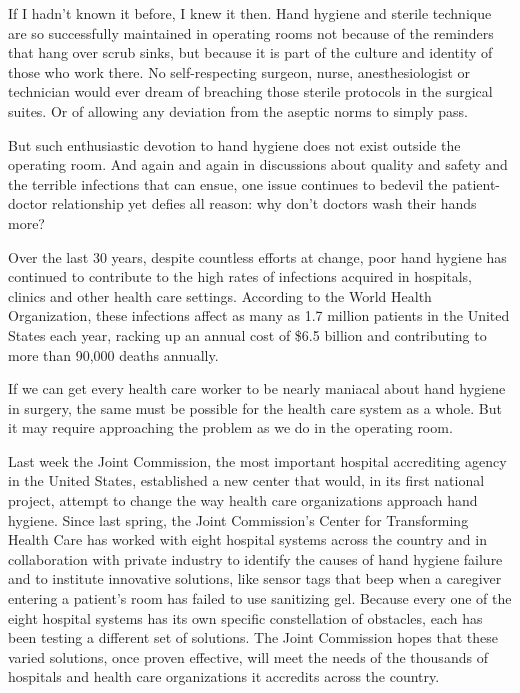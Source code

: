 ﻿\documentclass[12pt]{article}
\begin{document}
If I hadn't known it before, I knew it then. Hand hygiene and sterile technique are so successfully
maintained in operating rooms not because of the reminders that hang over scrub sinks, but because
it is part of the culture and identity of those who work there. No self-respecting surgeon, nurse,
anesthesiologist or technician would ever dream of breaching those sterile protocols in the surgical
suites. Or of allowing any deviation from the aseptic norms to simply pass.

But such enthusiastic devotion to hand hygiene does not exist outside the operating room. And again
and again in discussions about quality and safety and the terrible infections that can ensue, one
issue continues to bedevil the patient-doctor relationship yet defies all reason: why don't doctors
wash their hands more?

Over the last 30 years, despite countless efforts at change, poor hand hygiene has continued to
contribute to the high rates of infections acquired in hospitals, clinics and other health care
settings. According to the World Health Organization, these infections affect as many as 1.7 million
patients in the United States each year, racking up an annual cost of \$6.5 billion and contributing
to more than 90,000 deaths annually.

If we can get every health care worker to be nearly maniacal about hand hygiene in surgery, the same
must be possible for the health care system as a whole. But it may require approaching the problem
as we do in the operating room.

Last week the Joint Commission, the most important hospital accrediting agency in the United States,
established a new center that would, in its first national project, attempt to change the way health
care organizations approach hand hygiene. Since last spring, the Joint Commission's Center for
Transforming Health Care has worked with eight hospital systems across the country and in
collaboration with private industry to identify the causes of hand hygiene failure and to institute
innovative solutions, like sensor tags that beep when a caregiver entering a patient's room has
failed to use sanitizing gel. Because every one of the eight hospital systems has its own specific
constellation of obstacles, each has been testing a different set of solutions. The Joint Commission
hopes that these varied solutions, once proven effective, will meet the needs of the thousands of
hospitals and health care organizations it accredits across the country.
\end{document}
